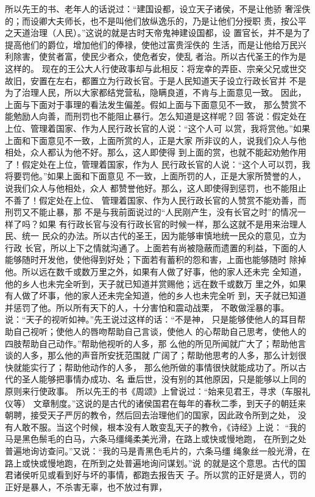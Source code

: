 \documentclass[12pt,UTF8]{ctexbook}
\begin{document}
所以先王的书、老年人的话说过：“建国设都，设立天子诸侯，不是让他骄 
奢淫佚的；而设卿大夫师长，也不是叫他们放纵逸乐的，乃是让他们分授职 
责，按公平之天道治理（人民）。”这说的就是古时天帝鬼神建设国都，设 
置官长，并不是为了提高他们的爵位，增加他们的俸禄，使他过富贵淫佚的 
生活，而是让他给万民兴利除害，使贫者富，使民少者众，使危者安，使乱 
者治。所以古代圣王的作为是这样的。 
现在的王公大人行使政事却与此相反：将宠幸的弄臣、宗亲父兄或世交 
故旧，安置在左右，都置立为行政长官。于是人民知道天子设立行政长官并 
不是为了治理人民，所以大家都结党营私，隐瞒良道，不肯与上面意见一致。 
因此，上面与下面对于事理的看法发生偏差。假如上面与下面意见不一致， 
那么赞赏不能勉励人向善，而刑罚也不能阻止暴行。怎么知道是这样呢？回 
答说：假定处在上位、管理着国家、作为人民行政长官的人说：“这个人可 
以赏，我将赏他。”如果上面和下面意见不一致，上面所赏的人，正是大家 
所非议的人，说我们众人与他相处，众人都认为他不好。那么，这人即使得 
到上面的赏，也就不能起劝勉作用了！假定处在上位，管理着国家，作为人 
民行政长官的人说：“这个人可以罚，我将要罚他。”如果上面和下面意见 
不一致，上面所罚的人，正是大家所赞誉的人，说我们众人与他相处，众人 
都赞誉他好。那么，这人即使得到惩罚，也不能阻止不善了！假定处在上位、 
管理着国家、作为人民行政长官的人赞赏不能劝善，而刑罚又不能止暴，那 
不是与我前面说过的“人民刚产生，没有长官之时”的情况一样了吗？如果 
有行政长官与没有行政长官的时候一样，那么这就不是用来治理人民、统一 
民众的办法。所以古代的圣王，因为能够审慎地统一民众的意见，立为行政 
长官，所以上下之情就沟通了。上面若有尚被隐蔽而遗置的利益，下面的人 
能够随时开发他，使他得到好处；下面若有蓄积的怨和害，上面也能够随时 
除掉他。所以远在数千或数万里之外，如果有人做了好事，他的家人还未完 
全知道，他的乡人也未完全听到，天子就已知道并赏赐他；远在数千或数万 
里之外，如果有人做了坏事，他的家人还未完全知道，他的乡人也未完全听 
到，天子就已知道并惩罚了他。所以所有天下的人，十分害怕和震动战栗， 
不敢做淫暴的事。说：“天子的视听如神。”先王说过这样的话：“不是神， 
只是能够使他人的耳目帮助自己视听；使他人的唇吻帮助自己言谈，使他人 
的心帮助自己思考，使他人的四肢帮助自己动作。”帮助他视听的人多，那 
么他的所见所闻就广大了；帮助他言谈的人多，那么他的声音所安抚范围就 
广阔了；帮助他思考的人多，那么计划很快就能实行了；帮助他动作的人多， 
那么他所做的事情很快就能成功了。所以古代的圣人能够把事情办成功、名 
垂后世，没有别的其他原因，只是能够以上同的原则来行使政事。 
所以先王的书《周颂》上曾说过：“始来见君王，寻求（车服礼仪等） 
文章制度。”这说的是古代的诸侯国君在每年的春秋二季，到天子的朝廷来 
朝聘，接受天子严厉的教令，然后回去治理他们的国家，因此政令所到之处， 
没有人敢不服。当这个时候，根本没有人敢变乱天子的教令，《诗经》上说： 
“我的马是黑色鬃毛的白马，六条马缰绳柔美光滑，在路上或快或慢地跑， 
在所到之处普遍地询访查问。”又说：“我的马是青黑色毛片的，六条马缰 
绳象丝一般光滑，在路上或快或慢地跑，在所到之处普遍地询问谋划。”说 
的就是这个意思。古代的国君诸侯听见或看到好与坏的事情，都跑去报告天 
子。所以赏的正好是贤人，罚的正好是暴人，不杀害无辜，也不放过有罪， 
\end{document}
